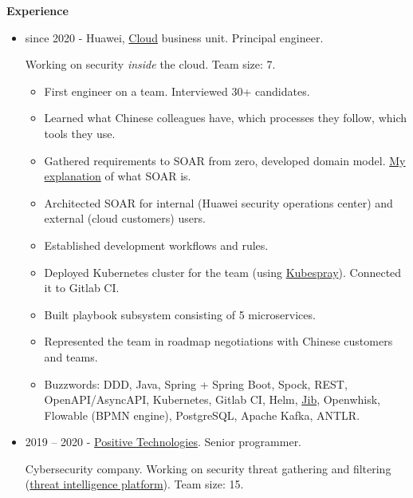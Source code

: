 \documentclass[final]{letter}
\begin{document}
{\bf Experience}
\begin{itemize}
  \item since 2020 - Huawei, \href{https://www.huaweicloud.com/en-us/}{Cloud} business unit. Principal engineer.

  Working on security \textit{inside} the cloud. Team size: 7.

  \begin{itemize}
    \item First engineer on a team. Interviewed 30+ candidates.
    \item Learned what Chinese colleagues have, which processes they follow, which tools they use.
    \item Gathered requirements to SOAR from zero, developed domain model. \href{https://neexee.github.io/posts-en/what-is-soar/}{My explanation} of what SOAR is.
    \item Architected SOAR for internal (Huawei security operations center) and external (cloud customers) users.
    \item Established development workflows and rules.
    \item Deployed Kubernetes cluster for the team (using \href{https://kubespray.io/}{Kubespray}). Connected it to Gitlab CI.
    \item Built playbook subsystem consisting of 5 microservices.
    \item Represented the team in roadmap negotiations with Chinese customers and teams.
    \item Buzzwords: DDD, Java, Spring + Spring Boot, Spock, REST, OpenAPI/AsyncAPI, Kubernetes, Gitlab CI, Helm, \href{https://github.com/GoogleContainerTools/jib}{Jib}, Openwhisk, Flowable (BPMN engine), PostgreSQL, Apache Kafka, ANTLR.
  \end{itemize}

  \item 2019 -- 2020 - \href{https://www.ptsecurity.com/ww-en/}{Positive Technologies}. Senior programmer.

  Cybersecurity company. Working on security threat gathering and filtering (\href{https://www.ptsecurity.com/ru-ru/products/cybersecurity-intelligence/}{threat intelligence platform}). Team size: 15.


\end{itemize}
\end{document}
